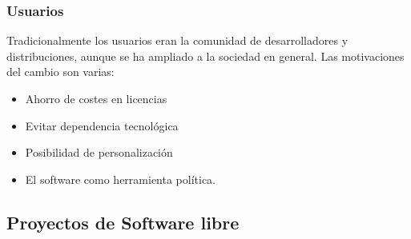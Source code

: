     \subsubsection{Usuarios}
        Tradicionalmente los usuarios eran la comunidad de desarrolladores y distribuciones, aunque se ha ampliado a la sociedad en general. Las motivaciones del cambio son varias:
        \begin{itemize}
            \item Ahorro de costes en licencias
            \item Evitar dependencia tecnológica
            \item Posibilidad de personalización
            \item El software como herramienta política.
        \end{itemize}

\subsection{Proyectos de Software libre}

